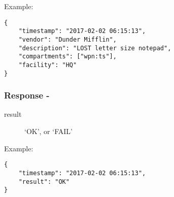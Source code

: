 \noindent Example:
\begin{verbatim}
{
    "timestamp": "2017-02-02 06:15:13",
    "vendor": "Dunder Mifflin",
    "description": "LOST letter size notepad",
    "compartments": ["wpn:ts"],
    "facility": "HQ"
}
\end{verbatim}


\subsubsection*{Response -}
\begin{description}
\item[result] `OK', or `FAIL'
\end{description}

\noindent Example:
\begin{verbatim}
{
    "timestamp": "2017-02-02 06:15:13",
    "result": "OK"
}
\end{verbatim}
